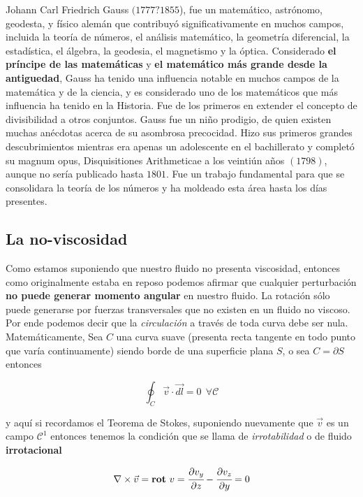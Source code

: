 \documentclass[a4paper,spanish]{article}
\numberwithin{equation}{section}
\begin{document}
Johann Carl Friedrich Gauss $(1777 ? 1855$), fue un matem\'atico, astr\'onomo, geodesta, y f\'isico alem\'an que contribuy\'o significativamente en muchos campos, incluida la teor\'ia de n\'umeros, el an\'alisis matem\'atico, la geometr\'ia diferencial, la estad\'istica, el \'algebra, la geodesia, el magnetismo y la \'optica. Considerado \textbf{el pr\'incipe de las matem\'aticas} y \textbf{el matem\'atico m\'as grande desde la antiguedad}, Gauss ha tenido una influencia notable en muchos campos de la matem\'atica y de la ciencia, y es considerado uno de los matem\'aticos que m\'as influencia ha tenido en la Historia. Fue de los primeros en extender el concepto de divisibilidad a otros conjuntos.
Gauss fue un ni\~no prodigio, de quien existen muchas an\'ecdotas acerca de su asombrosa precocidad. Hizo sus primeros grandes descubrimientos mientras era apenas un adolescente en el bachillerato y complet\'o su magnum opus, Disquisitiones Arithmeticae a los veinti\'un a\~nos $(1798)$, aunque no ser\'ia publicado hasta $1801$. Fue un trabajo fundamental para que se consolidara la teor\'ia de los n\'umeros y ha moldeado esta \'area hasta los d\'ias presentes.

\subsection{La no-viscosidad}
Como estamos suponiendo que nuestro fluido no presenta viscosidad, entonces como originalmente estaba en reposo podemos afirmar que cualquier perturbaci\'on \textbf{no puede generar momento angular} en nuestro fluido. La rotaci\'on s\'olo puede generarse por fuerzas transversales que no existen en un fluido no viscoso. Por ende podemos decir que la \textit{circulaci\'on} a trav\'es de toda curva debe ser nula. Matem\'aticamente, Sea $C$ una curva suave (presenta recta tangente en todo punto que var\'ia continuamente) siendo borde de una superficie plana $S$, o sea $C=\partial S$ entonces

\[ \oint_{C} {\vec{v} \cdot \vec{dl}} = 0 \ \ \forall \mathcal{C}\]

y aqu\'i si recordamos el Teorema de Stokes, suponiendo nuevamente que $\vec{v}$ es un campo $\mathcal{C}^1$ entonces tenemos la condici\'on que se llama de \textit{irrotabilidad} o de fluido \textbf{irrotacional}

\begin{equation}
\nabla \times \vec{v} = \textbf{rot} \ v = \cfrac{\partial v_y}{\partial z} - \cfrac{\partial v_z}{\partial y} = 0
\label{condiciones_irotabilidad_fluido}
\end{equation}
\end{document}
